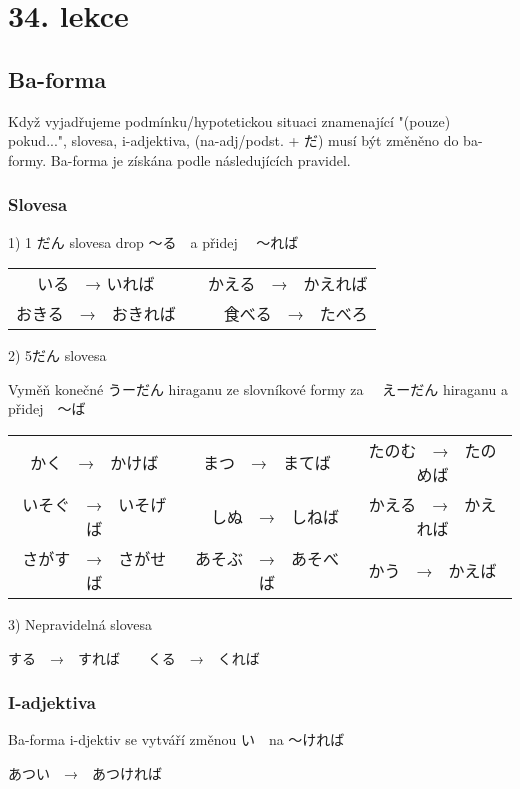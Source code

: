 
\section{34. lekce}
\label{sec:lekce_34}

\subsection{Ba-forma}
Když vyjadřujeme podmínku/hypotetickou situaci znamenající "(pouze) pokud...", slovesa, i-adjektiva, (na-adj/podst. + だ) musí být změněno do ba-formy. Ba-forma je získána podle následujících pravidel.

\subsubsection{Slovesa}

1) 1 だん slovesa
drop 〜る　a přidej 　〜れば
\begin{center}
\begin{tabular}{cc}
いる　→ いれば &　かえる　→　かえれば\\
おきる　→　おきれば &　　食べる　→　たべろ\\
\end{tabular}
\end{center}


2) 5だん slovesa

Vyměň konečné うーだん hiraganu ze slovníkové formy za 　えーだん hiraganu a přidej　〜ば
\begin{center}
\begin{tabular}{ccc}
かく　→　かけば　&まつ　→　まてば　&たのむ　→　たのめば\\
いそぐ　→　いそげば &　しぬ　→　しねば　&かえる　→　かえれば\\
さがす　→　さがせば　& あそぶ　→　あそべば　&かう　→　かえば\\
\end{tabular}
\end{center}


3) Nepravidelná slovesa

する　→　すれば　　くる　→　くれば



\subsubsection{I-adjektiva}

Ba-forma i-djektiv se vytváří změnou い　na 〜ければ

あつい　→　あつければ

